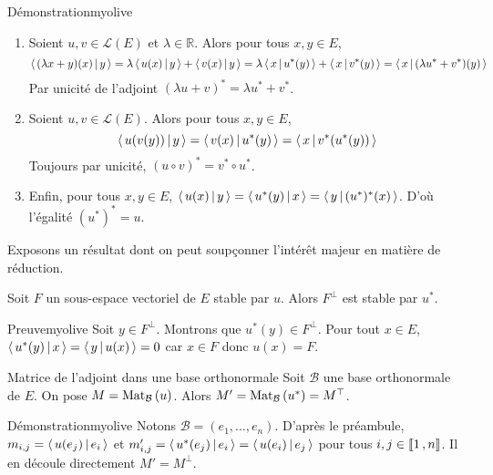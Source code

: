     \begin{demo}{Démonstration}{myolive}
        \begin{enumerate}
            \item Soient $u,v \in \mathcal{L}(E)$ et $\lambda \in \mathbb{R}$. Alors pour tous $x,y \in E$, 
            \[ \left<\,(\lambda x + y)(x)\,\middle|\,y\,\right> = \lambda \left<\,u(x)\,\middle|\,y\,\right> + \left<\,v(x)\,\middle|\,y\,\right> = \lambda\left<\,x\,\middle|\,u^*(y)\,\right> + \left<\,x\,\middle|\,v^*(y)\,\right> = \left<\,x\,\middle|\,(\lambda u^* + v^*)(y)\,\right> \]   
            Par unicité de l’adjoint $(\lambda u + v)^* = \lambda u^* + v^*$.
            \item Soient $u,v \in \mathcal{L}(E)$. Alors pour tous $x,y \in E$, 
            \[ \left<\,u(v(y))\,\middle|\,y\,\right> = \left<\,v(x)\,\middle|\,u^*(y)\,\right> = \left<\,x\,\middle|\,v^*(u^*(y))\,\right> \]   
            Toujours par unicité, $(u \circ v)^* = v^* \circ u^*$.
            \item Enfin, pour tous $x,y \in E$, $\left<\,u(x)\,\middle|\,y\,\right> = \left<\,u^*(y)\,\middle|\,x\,\right> = \left<\,y\,\middle|\,(u^*)^*(x)\,\right>$. D’où l’égalité $(u^*)^* = u$.
        \end{enumerate}
    \end{demo}

    Exposons un résultat dont on peut soupçonner l’intérêt majeur en matière de réduction.

    \begin{prop}{}{}
        Soit $F$ un sous-espace vectoriel de $E$ stable par $u$. Alors $F^{\perp}$ est stable par $u^*$.
    \end{prop}

    \begin{demo}{Preuve}{myolive}
        Soit $y \in F^{\perp}$. Montrons que $u^*(y) \in F^{\perp}$. Pour tout $x \in E$, $\left<\,u^*(y)\,\middle|\,x\,\right> = \left<\,y\,\middle|\,u(x)\,\right> = 0$ car $x \in F$ donc $u(x) = F$.
    \end{demo}

    \begin{prop}{Matrice de l’adjoint dans une base orthonormale}{}
        Soit $\mathcal{B}$ une base orthonormale de $E$. On pose $M = \text{Mat}_{\mathcal{B}}\left(u\right)$. Alors $M' = \text{Mat}_{\mathcal{B}}\left(u^*\right) = M^{\top}$.
    \end{prop}

    \begin{demo}{Démonstration}{myolive}
        Notons $\mathcal{B} = (e_1,\ldots,e_n)$. D’après le préambule, $m_{i,j} = \left<\,u(e_j)\,\middle|\,e_i\,\right>$ et $m_{i,j}' = \left<\,u^*(e_j)\,\middle|\,e_i\,\right> = \left<\,u(e_i)\,\middle|\,e_j\,\right>$ pour tous $i,j \in \left\llbracket 1 \, , n \right\rrbracket$. Il en découle directement $M' = M^{\perp}$.
    \end{demo}

